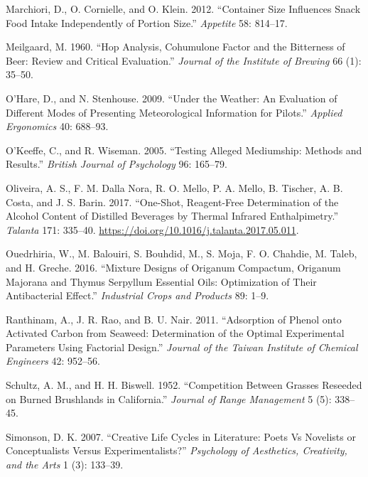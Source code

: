 \documentclass[
]{book}
\newlength{\cslhangindent}
\newenvironment{CSLReferences}[2] %
 {\begin{list}{}{%
  \setlength{\itemindent}{0pt}
  \setlength{\leftmargin}{0pt}
  \setlength{\parsep}{0pt}
  \ifodd #1
   \setlength{\leftmargin}{\cslhangindent}
   \setlength{\itemindent}{-1\cslhangindent}
  \fi
  \setlength{\itemsep}{#2\baselineskip}}}
 {\end{list}}
\begin{document}
\begin{CSLReferences}{1}{0}
Marchiori, D., O. Cornielle, and O. Klein. 2012. {``Container Size
Influences Snack Food Intake Independently of Portion Size.''}
\emph{Appetite} 58: 814--17.

Meilgaard, M. 1960. {``Hop Analysis, Cohumulone Factor and the
Bitterness of Beer: Review and Critical Evaluation.''} \emph{Journal of
the Institute of Brewing} 66 (1): 35--50.

O'Hare, D., and N. Stenhouse. 2009. {``Under the Weather: An Evaluation
of Different Modes of Presenting Meteorological Information for
Pilots.''} \emph{Applied Ergonomics} 40: 688--93.

O'Keeffe, C., and R. Wiseman. 2005. {``Testing Alleged Mediumship:
Methods and Results.''} \emph{British Journal of Psychology} 96:
165--79.

Oliveira, A. S., F. M. Dalla Nora, R. O. Mello, P. A. Mello, B. Tischer,
A. B. Costa, and J. S. Barin. 2017. {``One-Shot, Reagent-Free
Determination of the Alcohol Content of Distilled Beverages by Thermal
Infrared Enthalpimetry.''} \emph{Talanta} 171: 335--40.
\url{https://doi.org/10.1016/j.talanta.2017.05.011}.

Ouedrhiria, W., M. Balouiri, S. Bouhdid, M., S. Moja, F. O. Chahdie, M.
Taleb, and H. Greche. 2016. {``Mixture Designs of Origanum Compactum,
Origanum Majorana and Thymus Serpyllum Essential Oils: Optimization of
Their Antibacterial Effect.''} \emph{Industrial Crops and Products} 89:
1--9.

Ranthinam, A., J. R. Rao, and B. U. Nair. 2011. {``Adsorption of Phenol
onto Activated Carbon from Seaweed: Determination of the Optimal
Experimental Parameters Using Factorial Design.''} \emph{Journal of the
Taiwan Institute of Chemical Engineers} 42: 952--56.

Schultz, A. M., and H. H. Biswell. 1952. {``Competition Between Grasses
Reseeded on Burned Brushlands in California.''} \emph{Journal of Range
Management} 5 (5): 338--45.

Simonson, D. K. 2007. {``Creative Life Cycles in Literature: Poets Vs
Novelists or Conceptualists Versus Experimentalists?''} \emph{Psychology
of Aesthetics, Creativity, and the Arts} 1 (3): 133--39.


\end{CSLReferences}
\end{document}
